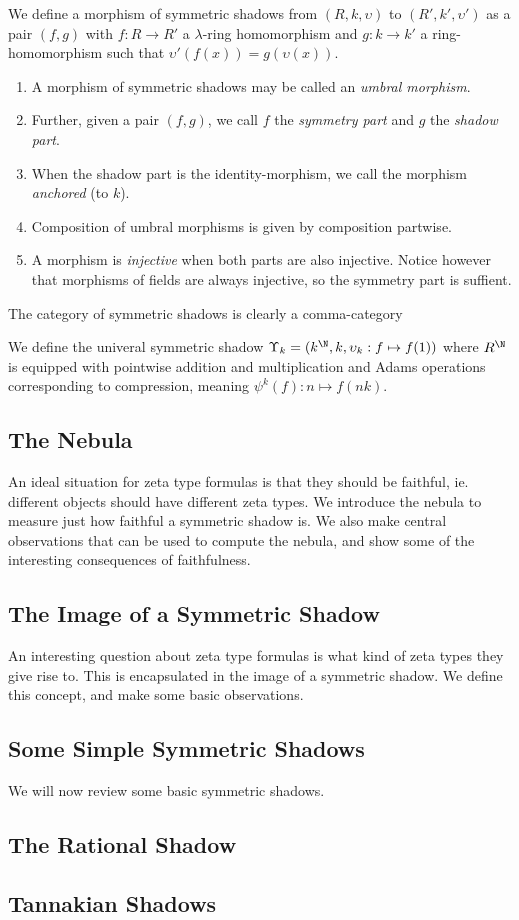 \begin{definition}
  We define a morphism of symmetric shadows from $(R, k, \upsilon)$ to $(R', k', \upsilon')$ as a pair $(f, g)$ with $f : R \to R'$ a $\lambda$-ring homomorphism and $g : k \to k'$ a ring-homomorphism such that $\upsilon'(f(x)) = g(\upsilon(x))$. 
  \begin{enumerate}
    \item A morphism of symmetric shadows may be called an \emph{umbral morphism}. 
    \item Further, given a pair $(f, g)$, we call $f$ the \emph{symmetry part} and $g$ the \emph{shadow part}. 
    \item When the shadow part is the identity-morphism, we call the morphism \emph{anchored} (to $k$). 
    \item Composition of umbral morphisms is given by composition partwise. 
    \item A morphism is \emph{injective} when both parts are also injective. Notice however that morphisms of fields are always injective, so the symmetry part is suffient.
  \end{enumerate}
\end{definition}

\begin{remark}
  The category of symmetric shadows is clearly a comma-category
\end{remark}

\begin{propdef}
  We define the univeral symmetric shadow $\Upsilon_k = (k^{\N}, k, \upsilon_k : f \mapsto f(1))$ where $R^{\N}$ is equipped with pointwise addition and multiplication and Adams operations corresponding to compression, meaning $\psi^k(f) : n \mapsto f(nk)$.
\end{propdef}

\subsection{The Nebula}
An ideal situation for zeta type formulas is that they should be faithful, ie. different objects should have different zeta types. We introduce the nebula to measure just how faithful a symmetric shadow is. We also make central observations that can be used to compute the nebula, and show some of the interesting consequences of faithfulness. 


\subsection{The Image of a Symmetric Shadow}
An interesting question about zeta type formulas is what kind of zeta types they give rise to. This is encapsulated in the image of a symmetric shadow. We define this concept, and make some basic observations.

\subsection{Some Simple Symmetric Shadows}
We will now review some basic symmetric shadows.

\subsection{The Rational Shadow}

\subsection{Tannakian Shadows}
